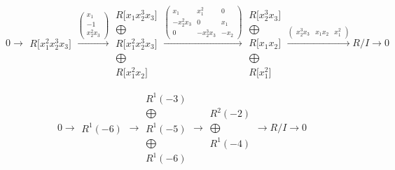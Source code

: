 \documentclass[12pt,a3paper,landscape]{amsart}
\numberwithin{equation}{section}
\theoremstyle{plain}
\theoremstyle{definition}
\begin{document}
$$
0 \rightarrow \begin{matrix}
R \lbrack x_{1}^{2}x_{2}^{3}x_{3} \rbrack
\end{matrix}
\xrightarrow{\left( \begin{matrix}
x_{1} \\
-1 \\
x_{2}^{2}x_{3}
\end{matrix} \right)}\begin{matrix}
R \lbrack x_{1}x_{2}^{3}x_{3} \rbrack \\ \bigoplus \\
R \lbrack x_{1}^{2}x_{2}^{3}x_{3} \rbrack \\ \bigoplus \\
R \lbrack x_{1}^{2}x_{2} \rbrack
\end{matrix}
\xrightarrow{\left( \begin{matrix}
x_{1} & x_{1}^{2} & 0 \\
-x_{2}^{2}x_{3} & 0 & x_{1} \\
0 & -x_{2}^{3}x_{3} & -x_{2}
\end{matrix} \right)}\begin{matrix}
R \lbrack x_{2}^{3}x_{3} \rbrack \\ \bigoplus \\
R \lbrack x_{1}x_{2} \rbrack \\ \bigoplus \\
R \lbrack x_{1}^{2} \rbrack
\end{matrix}
\xrightarrow{\left( \begin{matrix}
x_{2}^{3}x_{3} & x_{1}x_{2} & x_{1}^{2}
\end{matrix} \right)} R/I \rightarrow 0
$$

$$
0 \rightarrow \begin{matrix}
R^{1}(-6)
\end{matrix}
\rightarrow\begin{matrix}
R^{1}(-3)\\ \bigoplus \\
R^{1}(-5)\\ \bigoplus \\
R^{1}(-6)
\end{matrix}
\rightarrow\begin{matrix}
R^{2}(-2)\\ \bigoplus \\
R^{1}(-4)
\end{matrix}
\rightarrow R/I \rightarrow 0
$$
\end{document}
